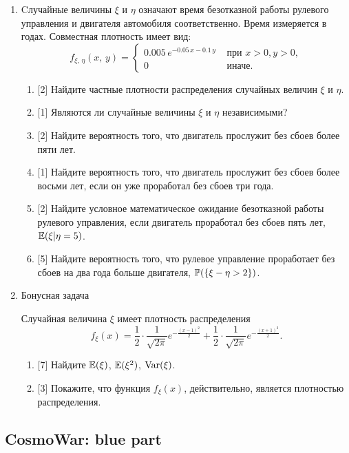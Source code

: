 \documentclass[12pt, a4paper]{article}\usepackage[]{graphicx}\usepackage[]{color}
\begin{document}
\begin{enumerate}
\newpage
\item
Cлучайные величины $\xi$ и $\eta$ означают время безотказной работы рулевого управления и двигателя автомобиля соответственно. Время измеряется в годах. Совместная плотность имеет вид:
\[
f_{\xi, \,\eta}(x,\,y) =
\begin{cases}
0.005\,e^{-0.05\,x-0.1\,y} & \text{ при } x > 0, y > 0, \\
0                    & \text{ иначе.}
\end{cases}
\]

\begin{enumerate}
  \item{} [2] Найдите частные плотности распределения случайных величин $\xi$ и $\eta$.
  \item{} [1] Являются ли случайные величины $\xi$ и $\eta$ независимыми?
  \item{} [2] Найдите вероятность того, что двигатель прослужит без сбоев более пяти лет.
  \item{} [1] Найдите вероятность того, что двигатель прослужит без сбоев более восьми лет, если он уже проработал без сбоев три года.
  \item{} [2] Найдите условное математическое ожидание безотказной работы рулевого управления, если двигатель проработал без сбоев пять лет,  $\E(\xi | \eta = 5)$.
  \item{} [5] Найдите вероятность того, что рулевое управление проработает без сбоев на два года больше двигателя,  $\P(\{\xi - \eta > 2\})$.
\end{enumerate}

\item Бонусная задача

Случайная величина $\xi$ имеет плотность распределения
\[
    f_{\xi}(x) = \frac{1}{2} \cdot \frac{1}{\sqrt{2\pi}}e^{-\frac{(x-1)^2}{2}} + \frac{1}{2} \cdot \frac{1}{\sqrt{2\pi}}e^{-\frac{(x+1)^2}{2}} \text{.}
\]

\begin{enumerate}
\item{} [7] Найдите $\E(\xi)$, $\E(\xi^2)$, $\Var(\xi)$.
\item{} [3] Покажите, что функция $f_{\xi}(x)$, действительно, является плотностью распределения.
\end{enumerate}


\end{enumerate}


\subsection{CosmoWar: blue part}
\end{document}
